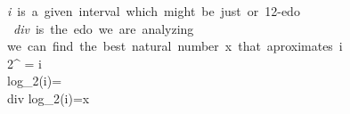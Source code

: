 \mbox{\textit{i} is a given interval which might be just or 12-edo} \\
\mbox{ \textit{div} is the edo we are analyzing } \\
\mbox{we can find the best natural number x that aproximates i} \\
2^{} = i \\
log_2{(i)}= \\
div \cdot log_2{(i)}=x \\